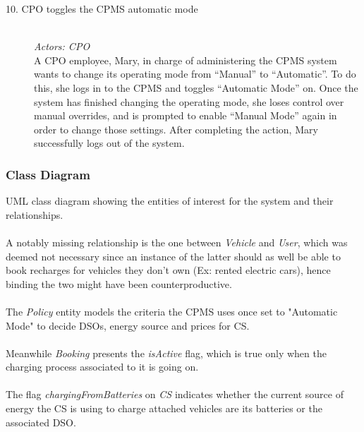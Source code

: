 \documentclass[11pt]{article}
\begin{document}
\begin{description}
    \item [10. CPO toggles the CPMS automatic mode] \hfill \\
        \textit{Actors: CPO} \\
        A CPO employee, Mary, in charge of administering the CPMS system wants to change its operating mode from “Manual” to “Automatic”. To do this, she logs in to the CPMS and toggles “Automatic Mode” on. Once the system has finished changing the operating mode, she loses control over manual overrides, and is prompted to enable “Manual Mode” again in order to change those settings. After completing the action, Mary successfully logs out of the system. \hfill \\
\end{description}

\subsubsection{Class Diagram}
\label{subsection:classDiagram}

UML class diagram showing the entities of interest for the system and their relationships. \\
\\
A notably missing relationship is the one between \textit{Vehicle} and \textit{User}, which was deemed not necessary since an instance of the latter should as well be able to book recharges for vehicles they don't own (Ex: rented electric cars), hence binding the two might have been counterproductive. \\
\\
The \textit{Policy} entity models the criteria the CPMS uses once set to "Automatic Mode" to decide DSOs, energy source and prices for CS. \\
\\
Meanwhile \textit{Booking} presents the \textit{isActive} flag, which is true only when the charging process associated to it is going on. \\
\\
The flag \textit{chargingFromBatteries} on \textit{CS} indicates whether the current source of energy the CS is using to charge attached vehicles are its batteries or the associated DSO.
\end{document}

